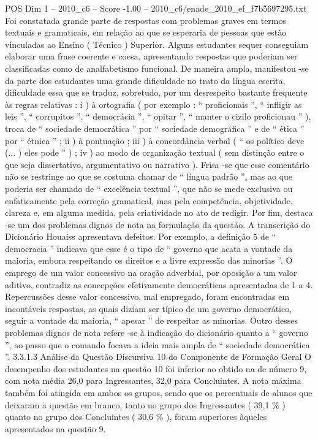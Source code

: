 \begin{textsample}{POS Dim 1 – 2010\_c6 – Score -1.00 – 2010\_c6/enade\_2010\_ef\_f7b5697295.txt}
Foi constatada grande parte de respostas com problemas graves em termos textuais e gramaticais, em relação ao que se esperaria de pessoas que estão vinculadas ao Ensino ( Técnico ) Superior.
Alguns estudantes sequer conseguiam elaborar uma frase coerente e coesa, apresentando respostas que poderiam ser classificadas como de analfabetismo funcional.
De maneira ampla, manifestou -se da parte dos estudantes uma grande dificuldade no trato da língua escrita, dificuldade essa que se traduz, sobretudo, por um desrespeito bastante frequente às regras relativas : i ) à ortografia ( por exemplo : “ proficionais ”, “ infligir as leis ”, “ corrupitos ”, “ democrácia ”, “ opitar ”, “ manter o cizilo proficionau ” ), troca de “ sociedade democrática ” por “ sociedade demográfica ” e de “ ética ” por “ étnica ” ; ii ) à pontuação ; iii ) à concordância verbal ( “ os político deve (... ) eles pode ” ) ; iv ) ao modo de organização textual ( sem distinção entre o que seja dissertativo, argumentativo ou narrativo ).
Frisa -se que esse comentário não se restringe ao que se costuma chamar de “ língua padrão ”, mas ao que poderia ser chamado de “ excelência textual ”, que não se mede exclusiva ou enfaticamente pela correção gramatical, mas pela competência, objetividade, clareza e, em alguma medida, pela criatividade no ato de redigir.
Por fim, destaca -se um dos problemas dignos de nota na formulação da questão.
A transcrição do Dicionário Houaiss apresentava defeitos.
Por exemplo, a definição 5 de “ democracia ” indicava que esse é o tipo de “ governo que acata a vontade da maioria, embora respeitando os direitos e a livre expressão das minorias ”.
O emprego de um valor concessivo na oração adverbial, por oposição a um valor aditivo, contradiz as concepções efetivamente democráticas apresentadas de 1 a 4.
Repercussões desse valor concessivo, mal empregado, foram encontradas em incontáveis respostas, as quais diziam ser típico de um governo democrático, seguir a vontade da maioria, “ apesar ” de respeitar as minorias.
Outro desses problemas dignos de nota refere -se à indicação do dicionário quanto a “ governo ”, ao passo que o comando focava a ideia mais ampla de “ sociedade democrática ”. 3.3.1.3 Análise da Questão Discursiva 10 do Componente de Formação Geral O desempenho dos estudantes na questão 10 foi inferior ao obtido na de número 9, com nota média 26,0 para Ingressantes, 32,0 para Concluintes.
A nota máxima também foi atingida em ambos os grupos, sendo que os percentuais de alunos que deixaram a questão em branco, tanto no grupo dos Ingressantes ( 39,1 \% ) quanto no grupo dos Concluintes ( 30,6 \% ), foram superiores àqueles apresentados na questão 9.

\end{textsample}
